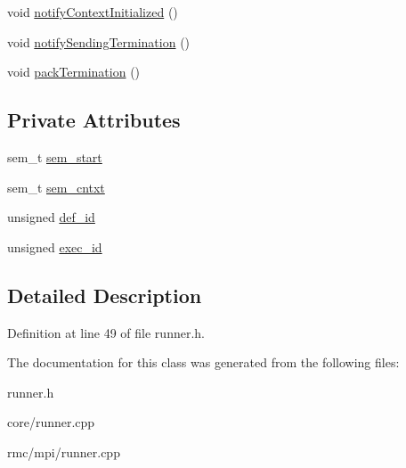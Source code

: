 \begin{CompactItemize}
\item 
\hypertarget{classRunner_2cce5433184ec8f89e06531c23acbcf8}{
void \hyperlink{classRunner_2cce5433184ec8f89e06531c23acbcf8}{notify\-Context\-Initialized} ()}
\label{classRunner_2cce5433184ec8f89e06531c23acbcf8}

\item 
\hypertarget{classRunner_3591be473e0fcee1105fb57319b529aa}{
void \hyperlink{classRunner_3591be473e0fcee1105fb57319b529aa}{notify\-Sending\-Termination} ()}
\label{classRunner_3591be473e0fcee1105fb57319b529aa}

\item 
\hypertarget{classRunner_2ad6d199d684d6f34347fc202ffe2fa3}{
void \hyperlink{classRunner_2ad6d199d684d6f34347fc202ffe2fa3}{pack\-Termination} ()}
\label{classRunner_2ad6d199d684d6f34347fc202ffe2fa3}

\end{CompactItemize}
\subsection*{Private Attributes}
\begin{CompactItemize}
\item 
\hypertarget{classRunner_4b0827d5df2df632db4ab71dd55e81b2}{
sem\_\-t \hyperlink{classRunner_4b0827d5df2df632db4ab71dd55e81b2}{sem\_\-start}}
\label{classRunner_4b0827d5df2df632db4ab71dd55e81b2}

\item 
\hypertarget{classRunner_66a5b083c6bc4cea06301db80cb80c99}{
sem\_\-t \hyperlink{classRunner_66a5b083c6bc4cea06301db80cb80c99}{sem\_\-cntxt}}
\label{classRunner_66a5b083c6bc4cea06301db80cb80c99}

\item 
\hypertarget{classRunner_bcadf488813aacbdeeefd3e0b9a618ee}{
unsigned \hyperlink{classRunner_bcadf488813aacbdeeefd3e0b9a618ee}{def\_\-id}}
\label{classRunner_bcadf488813aacbdeeefd3e0b9a618ee}

\item 
\hypertarget{classRunner_46671665b1f97e8a09ed9d5ffcf56966}{
unsigned \hyperlink{classRunner_46671665b1f97e8a09ed9d5ffcf56966}{exec\_\-id}}
\label{classRunner_46671665b1f97e8a09ed9d5ffcf56966}

\end{CompactItemize}


\subsection{Detailed Description}




Definition at line 49 of file runner.h.

The documentation for this class was generated from the following files:\begin{CompactItemize}
\item 
runner.h\item 
core/runner.cpp\item 
rmc/mpi/runner.cpp\end{CompactItemize}
